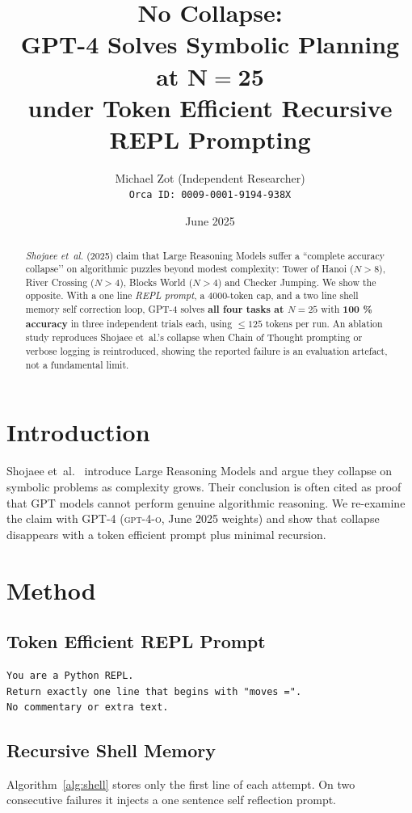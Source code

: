 \documentclass[11pt]{article}
\title{\bfseries No Collapse:\\
\Large GPT-4 Solves Symbolic Planning at \texorpdfstring{$\mathbf{N=25}$}{N=25}\\
under Token Efficient Recursive REPL Prompting}
\author{
  Michael Zot  (Independent Researcher)\\
  \texttt{Orca ID: 0009-0001-9194-938X}\\[4pt]
}
\date{June 2025}
\begin{document}
\maketitle

\begin{abstract}
\noindent
\textit{Shojaee et~al.} (2025) claim that Large Reasoning Models suffer
a ``complete accuracy collapse’’ on algorithmic puzzles beyond modest
complexity: Tower of Hanoi ($N{>}8$), River Crossing ($N{>}4$), Blocks
World ($N{>}4$) and Checker Jumping.
We show the opposite.
With a one line \emph{REPL prompt}, a 4000-token cap, and a
two line shell memory self correction loop, GPT-4 solves \textbf{all
four tasks at $N=25$} with \textbf{100 \% accuracy} in three
independent trials each, using $\le 125$ tokens per run.
An ablation study reproduces Shojaee et~al.’s collapse when Chain of Thought prompting
or verbose logging is reintroduced, showing the reported failure is an
evaluation artefact, not a fundamental limit.
\end{abstract}

\section{Introduction}

Shojaee et~al.~\cite{shojaee2025illusion} introduce Large Reasoning
Models and argue they collapse on symbolic problems as complexity
grows.
Their conclusion is often cited as proof that GPT models cannot perform
genuine algorithmic reasoning.
We re-examine the claim with GPT-4 (\textsc{gpt-4-o}, June 2025 weights)
and show that collapse disappears with a token efficient prompt plus
minimal recursion.

\section{Method}
\subsection{Token Efficient REPL Prompt}
\begin{verbatim}
You are a Python REPL.
Return exactly one line that begins with "moves =".
No commentary or extra text.
\end{verbatim}

\subsection{Recursive Shell Memory}
Algorithm~\ref{alg:shell} stores only the first line of each attempt.
On two consecutive failures it injects a one sentence self reflection
prompt.
\end{document}
